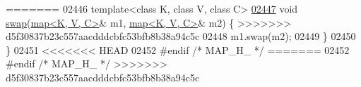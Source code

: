 \begin{DoxyCode}
=======
02446 \textcolor{keyword}{template}<\textcolor{keyword}{class} K, \textcolor{keyword}{class} V, \textcolor{keyword}{class} C>
\hyperlink{classaed2_1_1map_a119cb2938bbc11c25ebd4fb824782a72_a119cb2938bbc11c25ebd4fb824782a72}{02447} \textcolor{keywordtype}{void} \hyperlink{classaed2_1_1map_a119cb2938bbc11c25ebd4fb824782a72_a119cb2938bbc11c25ebd4fb824782a72}{swap}(\hyperlink{classaed2_1_1map}{map<K, V, C>}& m1, \hyperlink{classaed2_1_1map}{map<K, V, C>}& m2) \{
>>>>>>> d5f30837b23c557aacdddcbfc53bfb8b38a94c5c
02448     m1.swap(m2);
02449 \}
02450 \}
02451 
<<<<<<< HEAD
02452 \textcolor{preprocessor}{#endif }\textcolor{comment}{/* MAP\_H\_ */}
=======
02452 \textcolor{preprocessor}{#endif }\textcolor{comment}{/* MAP\_H\_ */}\textcolor{preprocessor}{}
>>>>>>> d5f30837b23c557aacdddcbfc53bfb8b38a94c5c
\end{DoxyCode}
